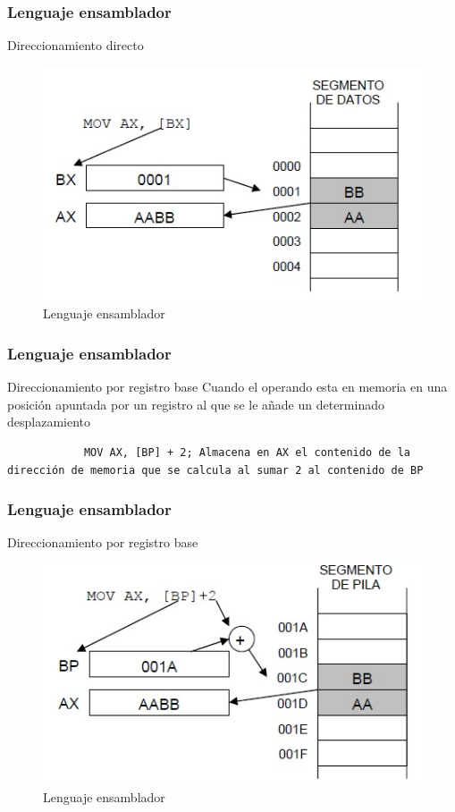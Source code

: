 \documentclass{beamer}
\begin{document}
\begin{frame}
	\frametitle{Lenguaje ensamblador}
	\begin{block}{Direccionamiento directo}
			\begin{figure}[H]
				\centering
				\includegraphics[scale=0.6]{imagenes/ensambladorindirecto.jpg}
				\caption{Lenguaje ensamblador}
			\end{figure}
	\end{block}		 		
\end{frame}


\begin{frame}[fragile]
	\frametitle{Lenguaje ensamblador}
	\begin{block}{Direccionamiento por registro base}
		Cuando el operando esta en memoria en una posición apuntada por un registro al que se le añade un determinado desplazamiento
		\begin{lstlisting}
			MOV AX, [BP] + 2; Almacena en AX el contenido de la dirección de memoria que se calcula al sumar 2 al contenido de BP
		\end{lstlisting}
	\end{block}
\end{frame}

\begin{frame}
	\frametitle{Lenguaje ensamblador}
	\begin{block}{Direccionamiento por registro base}
		\begin{figure}[H]
			\centering
			\includegraphics[scale=0.6]{imagenes/ensambladorbase.jpg}
			\caption{Lenguaje ensamblador}
		\end{figure}
	\end{block}		 		
\end{frame}
\end{document}
